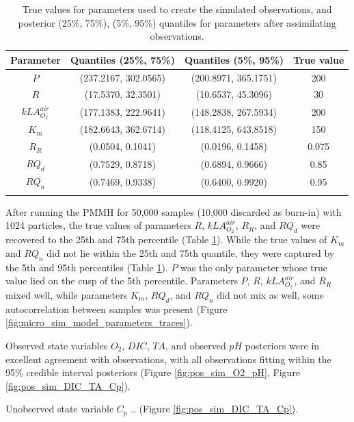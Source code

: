 \documentclass{ruthesis}
\begin{document}
\begin{longtable}{|c|c|c|c|} 
		\hline
		\bfseries{Parameter}  & \bfseries{Quantiles (25\%, 75\%)}  & \bfseries{Quantiles (5\%, 95\%)} &  \bfseries{True value} \\ \hline
		$P$ 				& (237.2167, 302.0565) 	& (200.8971, 365.1751) 	&  200  \\ 
		$R$ 				& (17.5370, 32.3501) 	& (10.6537, 45.3096)	& 	30 \\ 
		$kLA_{O_2}^{air}$ 	& (177.1383, 222.9641)  & (148.2838, 267.5934)  &  200 \\
		$K_m$ 				& (182.6643, 362.6714) 	& (118.4125, 643.8518) 	&  150 \\ 
		$R_R$ 				& (0.0504, 0.1041) 		& (0.0196, 0.1458) 		& 0.075 \\
		$RQ_d$ 				& (0.7529, 0.8718) 		& (0.6894, 0.9666) 		& 0.85 \\	
		$RQ_n$ 				& (0.7469, 0.9338) 		& (0.6400, 0.9920) 		& 0.95 \\	
		\hline
		\caption[.]{True values for parameters used to create the simulated observations, and posterior (25\%, 75\%), (5\%, 95\%) quantiles for parameters after assimilating observations.}	
		\label{table:micro_parameters_sim}
\end{longtable}

After running the PMMH for 50,000 samples (10,000 discarded as burn-in) with 1024 particles, the true values of parameters $R$, $kLA_{O_2}^{air}$, $R_R$, and $RQ_d$ were recovered to the 25th and 75th percentile (Table \ref{table:micro_parameters_sim}). While the true values of $K_m$ and $RQ_n$ did not lie within the 25th and 75th quantile, they were captured by the 5th and 95th percentiles (Table \ref{table:micro_parameters_sim}). $P$ was the only parameter whose true value lied on the cusp of the 5th percentile. Parameters $P$, $R$, $kLA_{O_2}^{air}$, and $R_R$ mixed well, while parameters $K_m$, $RQ_d$, and $RQ_n$ did not mix as well, some autocorrelation between samples was present (Figure \ref{fig:micro_sim_model_parameters_traces}).

Observed state variables $O_2$, $DIC$, $TA$, and observed $pH$ posteriors were in excellent agreement with observations, with all observations fitting within the 95\% credible interval posteriors (Figure \ref{fig:pos_sim_O2_pH}, Figure \ref{fig:pos_sim_DIC_TA_Cp}).


Unobserved state variable $C_p$ .. (Figure \ref{fig:pos_sim_DIC_TA_Cp}).
\end{document}
